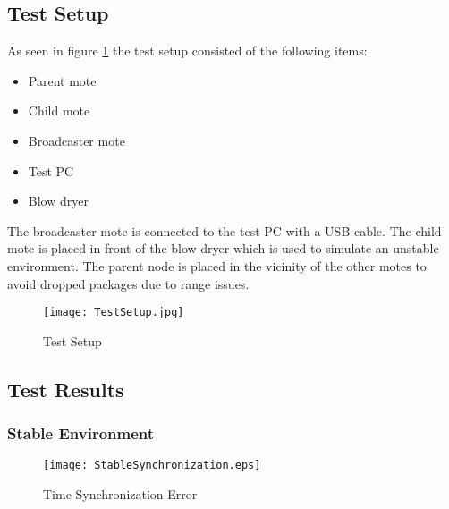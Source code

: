 \documentclass[Main]{subfiles}
\begin{document}
			


	\subsection{Test Setup} %
	\label{sub:test_setup}

		As seen in figure \ref{fig:TestSetup} the test setup consisted of the following items:

		\begin{itemize}
			\item Parent mote
			\item Child mote
			\item Broadcaster mote
			\item Test PC
			\item Blow dryer 
		\end{itemize}

		The broadcaster mote is connected to the test PC with a USB cable.
		The child mote is placed in front of the blow dryer which is used to simulate an unstable environment.
		The parent node is placed in the vicinity of the other motes to avoid dropped packages due to range issues.

		\begin{figure}[H]
			\centering
			\texttt{[image: TestSetup.jpg]}
			\caption{Test Setup}
			\label{fig:TestSetup}
		\end{figure}
	

	\subsection{Test Results} %
	\label{sub:test_results}

		\subsubsection{Stable Environment} %
		\label{sub:stable_environment}
			
			\begin{figure}[H]
				\centering
				\texttt{[image: StableSynchronization.eps]}
				\caption{Time Synchronization Error}
				\label{fig:Synchronization}
			\end{figure}

\end{document}
